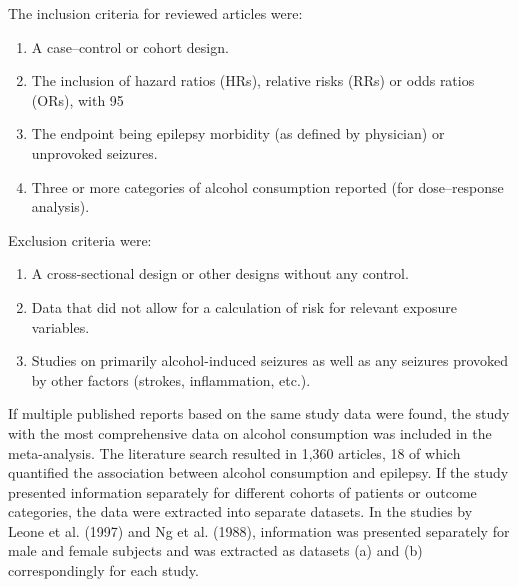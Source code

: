 \documentclass{article}
\begin{document}
The inclusion criteria for reviewed articles were:
\begin{enumerate}
  \item A case–control or cohort design.
  \item The inclusion of hazard ratios (HRs), relative risks (RRs) or odds ratios (ORs), with 95%
  \item The endpoint being epilepsy morbidity (as defined by physician) or unprovoked seizures.
  \item Three or more categories of alcohol consumption reported (for dose–response analysis).
\end{enumerate}

Exclusion criteria were:
\begin{enumerate}
  \item A cross-sectional design or other designs without any control.
  \item Data that did not allow for a calculation of risk for relevant exposure variables.
  \item Studies on primarily alcohol-induced seizures as well as any seizures provoked by other factors (strokes, inflammation, etc.).
\end{enumerate}

If multiple published reports based on the same study data were found, the study with the most comprehensive data on alcohol consumption was included in the meta-analysis. The literature search resulted in 1,360 articles, 18 of which quantified the association between alcohol consumption and epilepsy. If the study presented information separately for different cohorts of patients or outcome categories, the data were extracted into separate datasets. In the studies by Leone et al. (1997) and Ng et al. (1988), information was presented separately for male and female subjects and was extracted as datasets (a) and (b) correspondingly for each study.
\end{document}
